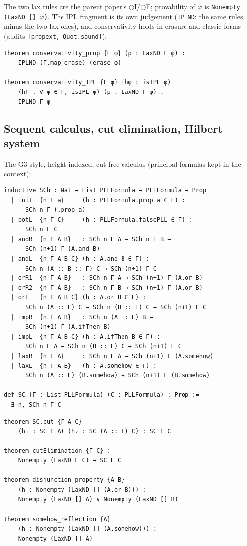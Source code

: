 \noindent The two lax rules are the parent paper's
\ensuremath{\bigcirc}I/\ensuremath{\bigcirc}E; provability of \ensuremath{\varphi} is
\texttt{Nonempty (LaxND [] \ensuremath{\varphi})}. The IPL fragment is its own
judgement (\texttt{IPLND}: the same rules minus the two lax ones), and
conservativity holds in erasure and classic forms (audits
\texttt{[propext, Quot.sound]}):

\begin{lstlisting}
theorem conservativity_prop {Γ φ} (p : LaxND Γ φ) :
    IPLND (Γ.map erase) (erase φ)

theorem conservativity_IPL {Γ φ} (hφ : isIPL φ)
    (hΓ : ∀ ψ ∈ Γ, isIPL ψ) (p : LaxND Γ φ) :
    IPLND Γ φ
\end{lstlisting}

\subsection{Sequent calculus, cut elimination, Hilbert system}

The G3-style, height-indexed, cut-free calculus (principal formulas
kept in the context):

\begin{lstlisting}
inductive SCh : Nat → List PLLFormula → PLLFormula → Prop
  | init  {n Γ a}     (h : PLLFormula.prop a ∈ Γ) :
      SCh n Γ (.prop a)
  | botL  {n Γ C}     (h : PLLFormula.falsePLL ∈ Γ) :
      SCh n Γ C
  | andR  {n Γ A B}   : SCh n Γ A → SCh n Γ B →
      SCh (n+1) Γ (A.and B)
  | andL  {n Γ A B C} (h : A.and B ∈ Γ) :
      SCh n (A :: B :: Γ) C → SCh (n+1) Γ C
  | orR1  {n Γ A B}   : SCh n Γ A → SCh (n+1) Γ (A.or B)
  | orR2  {n Γ A B}   : SCh n Γ B → SCh (n+1) Γ (A.or B)
  | orL   {n Γ A B C} (h : A.or B ∈ Γ) :
      SCh n (A :: Γ) C → SCh n (B :: Γ) C → SCh (n+1) Γ C
  | impR  {n Γ A B}   : SCh n (A :: Γ) B →
      SCh (n+1) Γ (A.ifThen B)
  | impL  {n Γ A B C} (h : A.ifThen B ∈ Γ) :
      SCh n Γ A → SCh n (B :: Γ) C → SCh (n+1) Γ C
  | laxR  {n Γ A}     : SCh n Γ A → SCh (n+1) Γ (A.somehow)
  | laxL  {n Γ A B}   (h : A.somehow ∈ Γ) :
      SCh n (A :: Γ) (B.somehow) → SCh (n+1) Γ (B.somehow)

def SC (Γ : List PLLFormula) (C : PLLFormula) : Prop :=
  ∃ n, SCh n Γ C
\end{lstlisting}

\begin{lstlisting}
theorem SC.cut {Γ A C}
    (h₁ : SC Γ A) (h₂ : SC (A :: Γ) C) : SC Γ C

theorem cutElimination {Γ C} :
    Nonempty (LaxND Γ C) ↔ SC Γ C

theorem disjunction_property {A B}
    (h : Nonempty (LaxND [] (A.or B))) :
    Nonempty (LaxND [] A) ∨ Nonempty (LaxND [] B)

theorem somehow_reflection {A}
    (h : Nonempty (LaxND [] (A.somehow))) :
    Nonempty (LaxND [] A)
\end{lstlisting}


